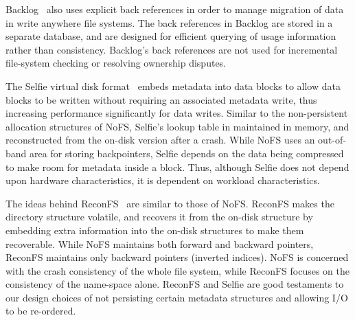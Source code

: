 Backlog~\cite{Macko2010} also uses explicit back references in order
to manage migration of data in write anywhere file systems. The back
references in Backlog are stored in a separate database, and are
designed for efficient querying of usage information rather than
consistency. Backlog's back references are not used for incremental
file-system checking or resolving ownership disputes.

The Selfie virtual disk format~\cite{wu2015selfie} embeds metadata
into data blocks to allow data blocks to be written without requiring
an associated metadata write, thus increasing performance
significantly for data writes. Similar to the non-persistent
allocation structures of NoFS, Selfie's lookup table in maintained in
memory, and reconstructed from the on-disk version after a crash.
While NoFS uses an out-of-band area for storing backpointers, Selfie
depends on the data being compressed to make room for metadata inside
a block. Thus, although Selfie does not depend upon hardware
characteristics, it is dependent on workload characteristics.

The ideas behind ReconFS~\cite{lu14-reconfs} are similar to those of
NoFS. ReconFS makes the directory structure volatile, and recovers it
from the on-disk structure by embedding extra information into the
on-disk structures to make them recoverable. While NoFS maintains both
forward and backward pointers, ReconFS maintains only backward
pointers (inverted indices). NoFS is concerned with the crash
consistency of the whole file system, while ReconFS focuses on the
consistency of the name-space alone. ReconFS and Selfie are
good testaments to our design choices of not persisting certain
metadata structures and allowing I/O to be re-ordered.


